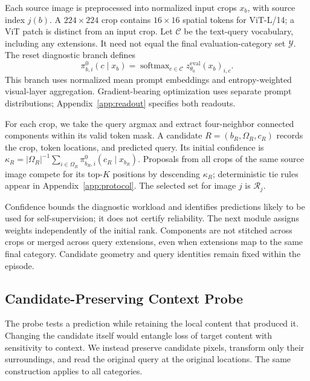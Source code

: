 \documentclass[letterpaper]{article}
\begin{document}
Each source image is preprocessed into normalized input crops $x_b$, with source index $j(b)$. A $224\times224$ crop contains $16\times16$ spatial tokens for ViT-L/14; a ViT patch is distinct from an input crop. Let $\mathcal C$ be the text-query vocabulary, including any extensions. It need not equal the final evaluation-category set $\mathcal Y$. The reset diagnostic branch defines
\begin{equation}
\pi^0_{b,i}(c\mid x_b)=\operatorname{softmax}_{c\in\mathcal C}
z^{\mathrm{eval}}_{\theta_0}(x_b)_{i,c}.
\label{eq:reference}
\end{equation}
This branch uses normalized mean prompt embeddings and entropy-weighted visual-layer aggregation. Gradient-bearing optimization uses separate prompt distributions; Appendix~\ref{app:readout} specifies both readouts.

For each crop, we take the query argmax and extract four-neighbor connected components within its valid token mask. A candidate $R=(b_R,\Omega_R,c_R)$ records the crop, token locations, and predicted query. Its initial confidence is $\kappa_R=|\Omega_R|^{-1}\sum_{i\in\Omega_R}\pi^0_{b_R,i}(c_R\mid x_{b_R})$. Proposals from all crops of the same source image compete for its top-$K$ positions by descending $\kappa_R$; deterministic tie rules appear in Appendix~\ref{app:protocol}. The selected set for image $j$ is $\mathcal R_j$.

Confidence bounds the diagnostic workload and identifies predictions likely to be used for self-supervision; it does not certify reliability. The next module assigns weights independently of the initial rank. Components are not stitched across crops or merged across query extensions, even when extensions map to the same final category. Candidate geometry and query identities remain fixed within the episode.

\subsection{Candidate-Preserving Context Probe}
The probe tests a prediction while retaining the local content that produced it. Changing the candidate itself would entangle loss of target content with sensitivity to context. We instead preserve candidate pixels, transform only their surroundings, and read the original query at the original locations. The same construction applies to all categories.
\end{document}
